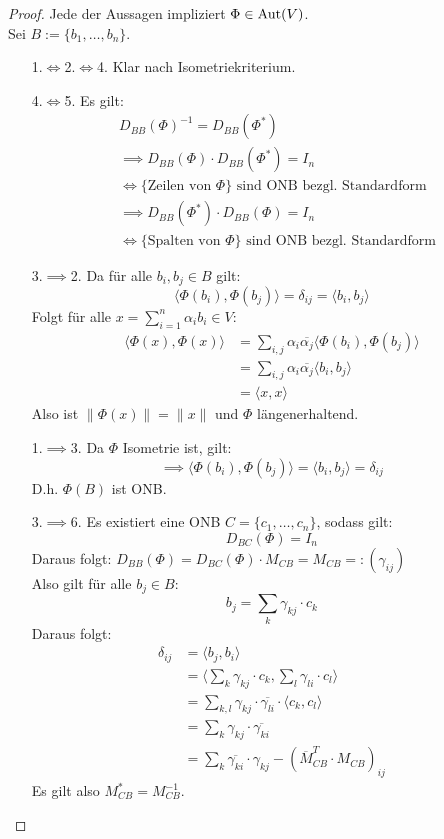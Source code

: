 \documentclass[parskip,a4paper,twoside,DIV15,BCOR12mm]{scrbook}
\begin{document}
\begin{proof}
Jede der Aussagen impliziert $\Phi\in\operatorname{Aut}(V)$.\\
Sei $B:=\{b_1,\ldots,b_n\}$.
\begin{enumerate}
\item[1.$\iff$2.$\iff$4.] Klar nach Isometriekriterium.
\item[4.$\iff$5.]Es gilt:
\begin{align*}
&D_{BB}(\Phi)^{-1} = D_{BB}(\Phi^*)\\
&	\implies D_{BB}(\Phi)\cdot D_{BB}(\Phi^*) = I_n\\
&\iff\{\text{Zeilen von }\Phi\}\text{ sind ONB bezgl. Standardform}\\
&\implies D_{BB}(\Phi^*)\cdot D_{BB}(\Phi) = I_n\\
&\iff\{\text{Spalten von }\Phi\}\text{ sind ONB bezgl. Standardform}
\end{align*}
\item[3.$\implies$2.]Da für alle $b_i,b_j\in B$ gilt:
\[\langle\Phi(b_i),\Phi(b_j)\rangle =\delta_{ij}=\langle b_i,b_j\rangle\]
Folgt für alle $x=\sum_{i=1}^n{\alpha_i b_i}\in V:$
\begin{align*}
\langle\Phi(x),\Phi(x)\rangle
&=\sum_{i,j}{\alpha_i\overline{\alpha_j}\langle\Phi(b_i),\Phi(b_j)\rangle}\\
&=\sum_{i,j}{\alpha_i\overline{\alpha_j}\langle b_i,b_j\rangle}\\
&=\langle x,x\rangle
\end{align*}
Also ist $\|\Phi(x)\|=\|x\|$ und $\Phi$ längenerhaltend.
\item[1.$\implies$3.] Da $\Phi$ Isometrie ist, gilt:
\[\implies \langle\Phi(b_i),\Phi(b_j)\rangle=\langle b_i,b_j\rangle =\delta_{ij}\]
D.h. $\Phi(B)$ ist ONB.
\item[3.$\implies$6.] Es existiert eine ONB $C=\{c_1,\ldots,c_n\}$, sodass gilt:
\[D_{BC}(\Phi) = I_n\]
Daraus folgt: $D_{BB}(\Phi)=D_{BC}(\Phi)\cdot M_{CB}=M_{CB}=:(\gamma_{ij})$\\
Also gilt für alle $b_j\in B$:
\[b_j=\sum_k{\gamma_{kj}\cdot c_k}\]
Daraus folgt:
\begin{align*}
\delta_{ij}&=\langle b_j,b_i\rangle\\
&=\langle\sum_k{\gamma_{kj}\cdot c_k},\sum_l{\gamma_{li}\cdot c_l}\rangle\\
&=\sum_{k,l}{\gamma_{kj}\cdot\overline{\gamma_{li}}\cdot\langle c_k,c_l\rangle}\\
&=\sum_k{\gamma_{kj}\cdot\overline{\gamma_{ki}}}\\
&=\sum_k{\overline{\gamma_{ki}}\cdot\gamma_{kj}}-(\overline{M}_{CB}^T\cdot M_{CB})_{ij}
\end{align*}
Es gilt also $M_{CB}^* = M_{CB}^{-1}$.
\end{enumerate}
\end{proof}
\end{document}
